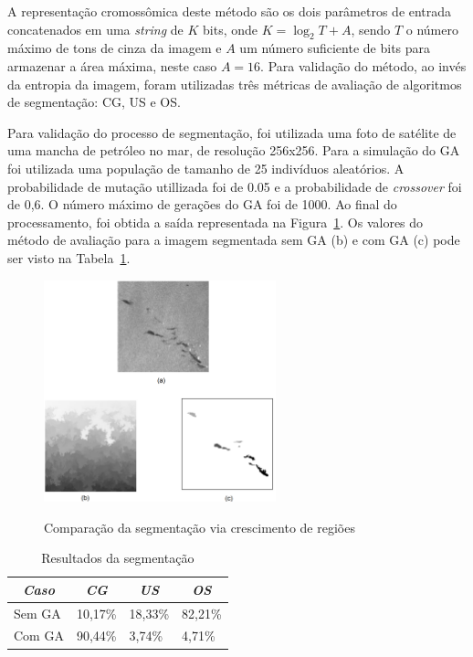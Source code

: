 \documentclass[12pt,oneside,a4paper,english,french,spanish,brazil,]{abntex2}
\begin{document}

A representação cromossômica deste método são os dois parâmetros de entrada concatenados em uma \textit{string} de \(K\) bits, onde \(K = \log_2 T + A\), sendo \(T\) o número máximo de tons de cinza da imagem e \(A\) um número suficiente de bits para armazenar a área máxima, neste caso \(A = 16\). Para validação do método, ao invés da entropia da imagem, foram utilizadas três métricas de avaliação de algoritmos de segmentação: CG, US e OS.

Para validação do processo de segmentação, foi utilizada uma foto de satélite de uma mancha de petróleo no mar, de resolução 256x256. Para a simulação do GA foi utilizada uma população de tamanho de 25 indivíduos aleatórios. A probabilidade de mutação utillizada foi de 0.05 e a probabilidade de \textit{crossover} foi de 0,6. O número máximo de gerações do GA foi de 1000. Ao final do processamento, foi obtida a saída representada na Figura~\ref{fig:TrCo_Matias_Crescimento_1}. Os valores do método de avaliação para a imagem segmentada sem GA (b) e com GA (c) pode ser visto na Tabela~\ref{tab:TrCo_Matias_1}.

\begin{figure}[ht]
\centering
\caption{Comparação da segmentação via crescimento de regiões}
\includegraphics[width=0.6\textwidth]{imagens/TrCo_Matias_Crescimento_1.PNG}
\label{fig:TrCo_Matias_Crescimento_1}
\end{figure}

\begin{table}
\centering
\caption{Resultados da segmentação}
\label{tab:TrCo_Matias_1}
\begin{tabular}{llll}
\hline
\multicolumn{1}{c}{\textit{\textbf{Caso}}} & \multicolumn{1}{c}{\textit{\textbf{CG}}} & \multicolumn{1}{c}{\textit{\textbf{US}}} & \multicolumn{1}{c}{\textit{\textbf{OS}}} \\ \hline
Sem GA                                     & 10,17\%                                  & 18,33\%                                  & 82,21\%                                  \\
Com GA                                     & 90,44\%                                  & 3,74\%                                   & 4,71\%                                   \\ \hline
\end{tabular}
\end{table}
\end{document}

